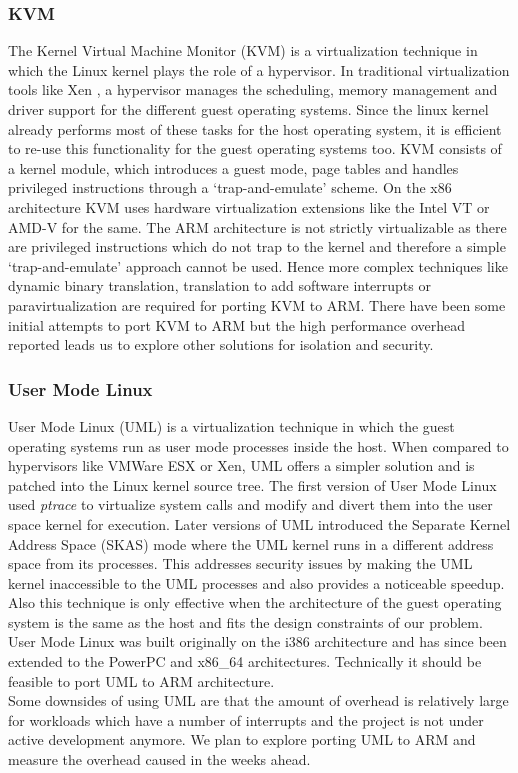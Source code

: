 \subsubsection{KVM}
The Kernel Virtual Machine Monitor (KVM) is a virtualization technique in which the Linux kernel plays the role of a hypervisor. In traditional virtualization tools like Xen \cite{xen}, a hypervisor manages the scheduling, memory management and driver support for the different guest operating systems. Since the linux kernel already performs most of these tasks for the host operating system, it is efficient to re-use this functionality for the guest operating systems too. KVM consists of a kernel module, which introduces a guest mode,  page tables and handles privileged instructions through a `trap-and-emulate' scheme. On the x86 architecture KVM uses hardware virtualization extensions like the Intel VT or AMD-V for the same. 
The ARM architecture is not strictly virtualizable as there are privileged instructions which do not trap to the kernel and therefore a simple `trap-and-emulate' approach cannot be used. Hence more complex techniques like dynamic binary translation, translation to add software interrupts or paravirtualization are required for porting KVM to ARM. There have been some initial attempts to port KVM to ARM \cite{columbia} but the high performance overhead reported leads us to explore other solutions for isolation and security. 

\subsubsection{User Mode Linux}
User Mode Linux (UML) is a virtualization technique in which the guest operating systems run as user mode processes inside the host. When compared to hypervisors like VMWare ESX or Xen, UML offers a simpler solution and is patched into the Linux kernel source tree. The first version of User Mode Linux used \emph{ptrace} to virtualize system calls and modify and divert them into the user space kernel for execution. Later versions of UML introduced the Separate Kernel Address Space (SKAS) mode  where the UML kernel runs in a different address space from its processes. This addresses security issues by making the UML kernel inaccessible to the UML processes and also provides a noticeable speedup. Also this technique is only effective when the architecture of the guest operating system is the same as the host and fits the design constraints of our problem. User Mode Linux was built originally on the i386 architecture and has since been extended to the PowerPC and x86\_64 architectures. Technically it should be feasible to port UML to ARM architecture. \\
Some downsides of using UML are that the amount of overhead is relatively large for workloads which have a number of interrupts and the project is not under active development anymore. We plan to explore porting UML to ARM and measure the overhead caused in the weeks ahead. 

